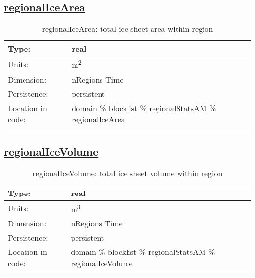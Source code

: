 \subsection[regionalIceArea]{\hyperref[sec:var_tab_regionalStatsAM]{regionalIceArea}}
\label{subsec:var_sec_regionalStatsAM_regionalIceArea}
\begin{center}
\begin{longtable}{| p{2.0in} | p{4.0in} |}
        \hline 
        Type: & real \\
        \hline 
        Units: & \si{m^2} \\
        \hline 
        Dimension: & nRegions Time \\
        \hline 
        Persistence: & persistent \\
        \hline 
         Location in code: & domain \% blocklist \% regionalStatsAM \% regionalIceArea \\
         \hline 
    \caption{regionalIceArea: total ice sheet area within region}
\end{longtable}
\end{center}
\subsection[regionalIceVolume]{\hyperref[sec:var_tab_regionalStatsAM]{regionalIceVolume}}
\label{subsec:var_sec_regionalStatsAM_regionalIceVolume}
\begin{center}
\begin{longtable}{| p{2.0in} | p{4.0in} |}
        \hline 
        Type: & real \\
        \hline 
        Units: & \si{m^3} \\
        \hline 
        Dimension: & nRegions Time \\
        \hline 
        Persistence: & persistent \\
        \hline 
         Location in code: & domain \% blocklist \% regionalStatsAM \% regionalIceVolume \\
         \hline 
    \caption{regionalIceVolume: total ice sheet volume within region}
\end{longtable}
\end{center}
